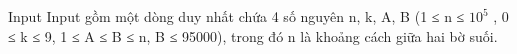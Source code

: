 Input
Input gồm một dòng duy nhất chứa 4 số nguyên n, k, A, B (1 ≤ n ≤ $10^{5}$   , 0 ≤ k ≤ 9, 1 ≤ A ≤ B ≤ n, B ≤ 95000), trong đó n là khoảng cách giữa hai bờ suối.